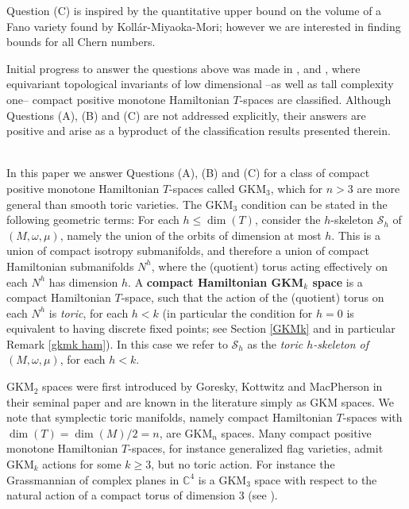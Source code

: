 \documentclass[12pt,a4paper]{amsart}
\newcommand{\CC}{\mathbb{C}}
\theoremstyle{plain}
\theoremstyle{definition}
\begin{document}
Question (C) is inspired by the quantitative upper bound on the volume of a Fano variety found by Koll\'ar-Miyaoka-Mori;
however we are interested in finding bounds for all Chern numbers. 

Initial progress to answer the questions above was made in \cite{ChartonKesslerMonotone},
\cite{CSSMonotone} and
\cite{MR4940256}, where equivariant topological invariants of low dimensional  --as well as tall
complexity one-- compact positive monotone Hamiltonian $T$-spaces are classified. Although
Questions (A), (B) and (C) are not addressed explicitly, their answers are positive and arise as a byproduct 
of the classification results presented therein.
\\$\;$


In this paper we answer Questions (A), (B) and (C) for a class of compact positive monotone Hamiltonian $T$-spaces called GKM$_3$,
which for $n>3$ are more general than smooth toric varieties. 
The GKM$_3$ condition can be stated in the following geometric terms:
For each $h\leq \dim(T)$, consider the $h$-skeleton $\mathcal{S}_h$ of $(M,\omega,\mu)$, namely the union of the orbits of dimension at most $h$. This is a union of compact isotropy submanifolds, and therefore a union of compact Hamiltonian submanifolds $N^h$, where the (quotient) torus acting effectively on each $N^h$ has dimension $h$. A \textbf{compact Hamiltonian GKM$_k$ space}
is a compact Hamiltonian $T$-space, such that the action of the (quotient) torus on each $N^h$ is \emph{toric}, for each $h< k$ (in particular the condition for $h=0$ is equivalent to having discrete fixed points; see Section \ref{GKMk} and in particular Remark \ref{gkmk ham}). 
In this case we refer to $\mathcal{S}_h$ as the \emph{toric $h$-skeleton of} $(M,\omega,\mu)$, for each $h<k$. 

GKM$_2$ spaces were first introduced by Goresky, Kottwitz and MacPherson in their seminal
paper \cite{MR1489894} and are known in the literature simply as GKM spaces. We note that
symplectic toric manifolds, namely compact Hamiltonian $T$-spaces with
$\dim(T)=\dim(M)/2=n$, are GKM$_n$ spaces. 
Many compact positive monotone Hamiltonian $T$-spaces, for instance generalized flag varieties, admit GKM$_k$ actions for some $k\geq 3$, but no toric action.
For instance 
the Grassmannian of complex planes in $\CC^4$ is a GKM$_3$ space with respect to the natural action of a compact torus of dimension 3 (see \cite[Section 5]{MR3695881}).
\end{document}
